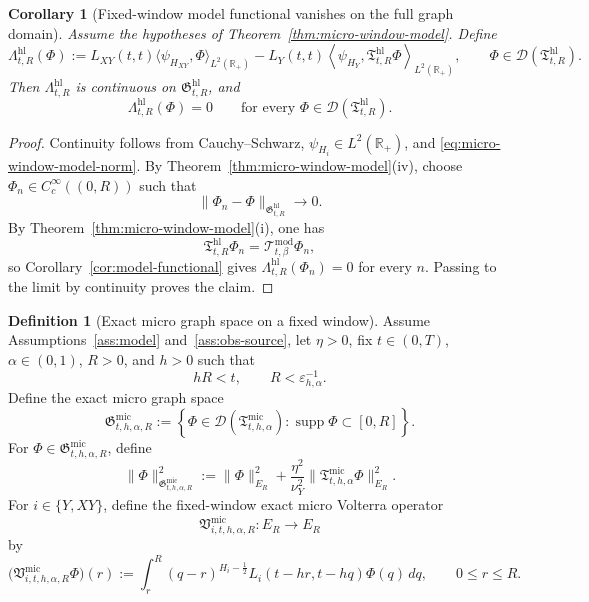 \documentclass[11pt,a4paper]{amsart}
\theoremstyle{plain}
\newtheorem{corollary}[theorem]{Corollary}
\theoremstyle{definition}
\newtheorem{definition}[theorem]{Definition}
\theoremstyle{remark}
\newcommand{\R}{\mathbb{R}}
\begin{document}
\begin{corollary}[Fixed-window model functional vanishes on the full graph domain]
\label{cor:micro-window-model-functional}
Assume the hypotheses of Theorem~\ref{thm:micro-window-model}. Define
\[
\Lambda_{t,R}^{\mathrm{hl}}(\Phi)
:=
L_{XY}(t,t)\langle \psi_{H_{XY}},\Phi\rangle_{L^2(\R_+)}
-L_Y(t,t)
\left\langle
\psi_{H_Y},
\mathfrak T_{t,R}^{\mathrm{hl}}\Phi
\right\rangle_{L^2(\R_+)},
\qquad
\Phi\in\mathcal D(\mathfrak T_{t,R}^{\mathrm{hl}}).
\]
Then \(\Lambda_{t,R}^{\mathrm{hl}}\) is continuous on \(\mathfrak G_{t,R}^{\mathrm{hl}}\), and
\[
\Lambda_{t,R}^{\mathrm{hl}}(\Phi)=0
\qquad\text{for every }\Phi\in \mathcal D(\mathfrak T_{t,R}^{\mathrm{hl}}).
\]
\end{corollary}

\begin{proof}
Continuity follows from Cauchy--Schwarz, \(\psi_{H_i}\in L^2(\R_+)\), and
\eqref{eq:micro-window-model-norm}. By Theorem~\ref{thm:micro-window-model}(iv), choose
\(\Phi_n\in C_c^\infty((0,R))\) such that
\[
\|\Phi_n-\Phi\|_{\mathfrak G_{t,R}^{\mathrm{hl}}}\to 0.
\]
By Theorem~\ref{thm:micro-window-model}(i), one has
\[
\mathfrak T_{t,R}^{\mathrm{hl}}\Phi_n=\mathcal T_{t,\beta}^{\mathrm{mod}}\Phi_n,
\]
so Corollary~\ref{cor:model-functional} gives \(\Lambda_{t,R}^{\mathrm{hl}}(\Phi_n)=0\) for every
\(n\). Passing to the limit by continuity proves the claim.
\end{proof}

\begin{definition}[Exact micro graph space on a fixed window]
\label{def:micro-window-exact}
Assume Assumptions~\ref{ass:model} and~\ref{ass:obs-source}, let \(\eta>0\), fix
\(t\in(0,T)\), \(\alpha\in(0,1)\), \(R>0\), and \(h>0\) such that
\[
hR<t,
\qquad
R<\varepsilon_{h,\alpha}^{-1}.
\]
Define the exact micro graph space
\[
\mathfrak G_{t,h,\alpha,R}^{\mathrm{mic}}
:=
\left\{
\Phi\in \mathcal D(\mathfrak T_{t,h,\alpha}^{\mathrm{mic}}):
\operatorname{supp}\Phi\subset [0,R]
\right\}.
\]
For \(\Phi\in\mathfrak G_{t,h,\alpha,R}^{\mathrm{mic}}\), define
\begin{equation}\label{eq:micro-window-graph-norm}
\|\Phi\|_{\mathfrak G_{t,h,\alpha,R}^{\mathrm{mic}}}^2
:=
\|\Phi\|_{E_R}^2
+\frac{\eta^2}{\nu_Y^2}
\|\mathfrak T_{t,h,\alpha}^{\mathrm{mic}}\Phi\|_{E_R}^2.
\end{equation}
For \(i\in\{Y,XY\}\), define the fixed-window exact micro Volterra operator
\[
\mathfrak V_{i,t,h,\alpha,R}^{\mathrm{mic}}:E_R\to E_R
\]
by
\[
\bigl(
\mathfrak V_{i,t,h,\alpha,R}^{\mathrm{mic}}\Phi
\bigr)(r)
:=
\int_r^R
(q-r)^{H_i-\frac12}
L_i(t-hr,t-hq)\Phi(q)\,dq,
\qquad 0\le r\le R.
\]
\end{definition}
\end{document}
